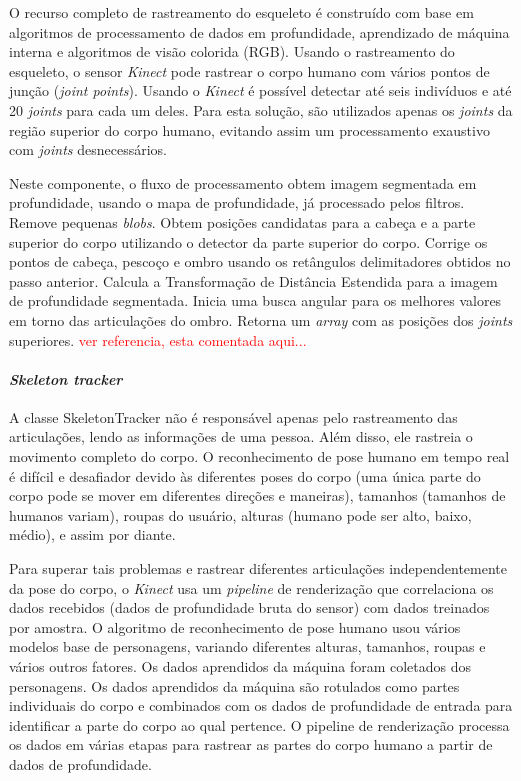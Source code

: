 O recurso completo de rastreamento do esqueleto é construído com base em algoritmos de processamento de dados em profundidade, aprendizado de máquina interna e algoritmos de visão colorida (RGB). Usando o rastreamento do esqueleto, o sensor \textit{Kinect} pode rastrear o corpo humano com vários pontos de junção (\textit{joint points}). Usando o \textit{Kinect} é possível detectar até seis indivíduos e até 20 \textit{joints} para cada um deles. Para esta solução, são utilizados apenas os \textit{joints} da região superior do corpo humano, evitando assim um processamento exaustivo com \textit{joints} desnecessários.

Neste componente, o fluxo de processamento obtem imagem segmentada em profundidade, usando o mapa de profundidade, já processado pelos filtros. Remove pequenas \textit{blobs}. Obtem posições candidatas para a cabeça e a parte superior do corpo utilizando o detector da parte superior do corpo. Corrige os pontos de cabeça, pescoço e ombro usando os retângulos delimitadores obtidos no passo anterior. Calcula a Transformação de Distância Estendida para a imagem de profundidade segmentada. Inicia uma busca angular para os melhores valores em torno das articulações do ombro. Retorna um \textit{array} com as posições dos \textit{joints} superiores. \textcolor{red}{ver referencia, esta comentada aqui... %
}

\paragraph{\textit{Skeleton tracker}}\label{sec:SkeletonTracker}
A classe SkeletonTracker não é responsável apenas pelo rastreamento das articulações, lendo as informações de uma pessoa. Além disso, ele rastreia o movimento completo do corpo. O reconhecimento de pose humano em tempo real é difícil e desafiador devido às diferentes poses do corpo (uma única parte do corpo pode se mover em diferentes direções e maneiras), tamanhos (tamanhos de humanos variam), roupas do usuário, alturas (humano pode ser alto, baixo, médio), e assim por diante.

Para superar tais problemas e rastrear diferentes articulações independentemente da pose do corpo, o \textit{Kinect} usa um \textit{pipeline} de renderização que correlaciona os dados recebidos (dados de profundidade bruta do sensor) com dados treinados por amostra. O algoritmo de reconhecimento de pose humano usou vários modelos base de personagens, variando diferentes alturas, tamanhos, roupas e vários outros fatores. Os dados aprendidos da máquina foram coletados dos personagens. Os dados aprendidos da máquina são rotulados como partes individuais do corpo e combinados com os dados de profundidade de entrada para identificar a parte do corpo ao qual pertence. O pipeline de renderização processa os dados em várias etapas para rastrear as partes do corpo humano a partir de dados de profundidade.

